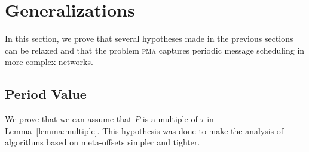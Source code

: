 \documentclass[a4paper,UKenglish,cleveref, autoref, thm-restate]{lipics-v2019}
\newcommand\pma{\textsc{pma}\xspace}
\begin{document}
\section{Generalizations}\label{sec:gen}

In this section, we prove that several hypotheses made in the previous sections can be relaxed and that the problem \pma captures periodic message scheduling in more complex networks.

\subsection{Period Value}


We prove that we can assume that $P$ is a multiple of $\tau$ in Lemma~\ref{lemma:multiple}. This hypothesis was done to make the analysis of algorithms based on meta-offsets simpler and tighter. 
\end{document}
